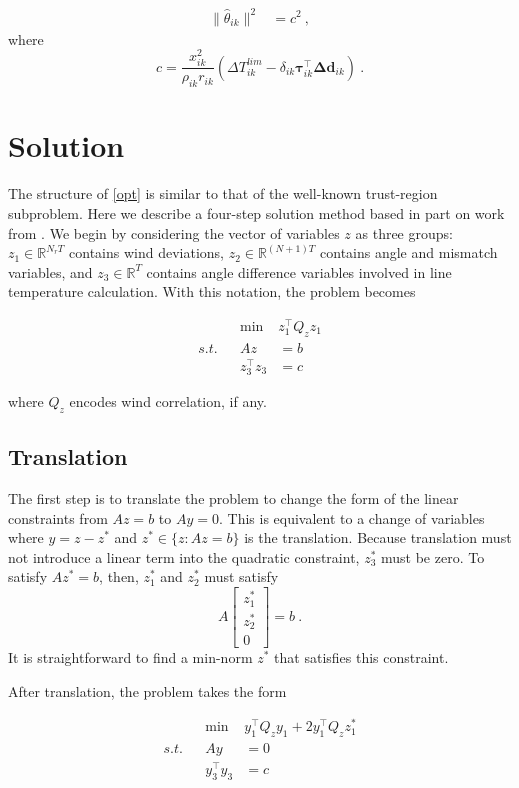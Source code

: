 \documentclass[conference]{IEEEtran}
\begin{document}
\begin{align*}
\lVert \hat{\theta}_{ik}\rVert^2 &= c^2~,
\end{align*}
where $$c = \frac{x_{ik}^2}{\rho_{ik} r_{ik}} \left(\Delta T_{ik}^{lim} - \delta_{ik} \boldsymbol{\tau}_{ik}^\top \boldsymbol{\Delta d}_{ik}\right)~. $$

\section{Solution}

The structure of \eqref{opt} is similar to that of the well-known trust-region subproblem. Here we describe a four-step solution method based in part on work from \cite{bienstock2014}. We begin by considering the vector of variables $z$ as three groups: $z_1\in\mathbb{R}^{N_rT}$ contains wind deviations, $z_2\in\mathbb{R}^{(N+1)T}$ contains angle and mismatch variables, and $z_3\in\mathbb{R}^T$ contains angle difference variables involved in line temperature calculation. With this notation, the problem becomes

\begin{align*}
&& \min~ & z_1^\top Q_z z_1 \\
s.t. && Az &= b \\
&& z_3^\top z_3 &= c
\end{align*}

where $Q_z$ encodes wind correlation, if any.

\subsection{Translation}

The first step is to translate the problem to change the form of the linear constraints from $Az=b$ to $Ay=0$. This is equivalent to a change of variables where $y=z-z^*$ and $z^*\in\{z:Az=b\}$ is the translation. Because translation must not introduce a linear term into the quadratic constraint, $z_3^*$ must be zero. To satisfy $Az^*=b$, then, $z_1^*$ and $z_2^*$ must satisfy $$ A\begin{bmatrix} z_1^* \\ z_2^* \\ 0 \end{bmatrix} = b ~.$$ It is straightforward to find a min-norm $z^*$ that satisfies this constraint.

After translation, the problem takes the form

\begin{subequations}\label{opt2}
\begin{align}
\label{opt2:obj} && \min~ & y_1^\top Q_z y_1 + 2 y_1^\top Q_z z_1^* \\
\label{opt2:lin} s.t. && Ay &= 0 \\
\label{opt2:quad} && y_3^\top y_3 &= c
\end{align}
\end{subequations}
\end{document}
